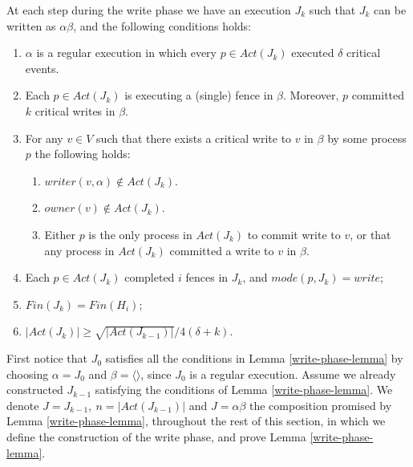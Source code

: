 \begin{lemma} \label{write-phase-lemma}
	At each step during the write phase we have an execution $J_k$ such that $J_k$ can be written as $\alpha \beta$, and the following conditions holds:
	\begin{enumerate}[(1)]
		\item $\alpha$ is a regular execution in which every $p \in Act(J_k)$ executed $\delta$ critical events.
		\item Each $p \in Act(J_k)$ is executing a (single) fence in $\beta$. Moreover, $p$ committed $k$ critical writes in $\beta$.
		\item For any $v \in V$ such that there exists a critical write to $v$ in $\beta$ by some process $p$ the following holds:
		\begin{enumerate}
			\item $writer(v,\alpha) \notin Act(J_k)$.
			\item $owner(v) \notin Act(J_k)$.
			\item Either $p$ is the only process in $Act(J_k)$ to commit write to $v$, or that any process in $Act(J_k)$ committed a write to $v$ in $\beta$.
		\end{enumerate}
		\item Each $p\in Act(J_k)$ completed $i$ fences in $J_k$, and $mode(p, J_k) = write$;
		\item $Fin(J_k) = Fin(H_i)$;
		\item $|Act(J_k)| \geq \sqrt{|Act(J_{k-1})|}/4(\delta+k)$.
	\end{enumerate}
\end{lemma}

First notice that $J_0$ satisfies all the conditions in Lemma \ref{write-phase-lemma} by choosing $\alpha = J_0$ and $\beta = \langle \rangle$, since $J_0$ is a regular execution. Assume we already constructed $J_{k-1}$ satisfying the conditions of Lemma \ref{write-phase-lemma}. We denote $J=J_{k-1},\ n=|Act(J_{k-1})|$ and $J = \alpha \beta$ the composition promised by Lemma \ref{write-phase-lemma}, throughout the rest of this section, in which we define the construction of the write phase, and prove Lemma \ref{write-phase-lemma}.


